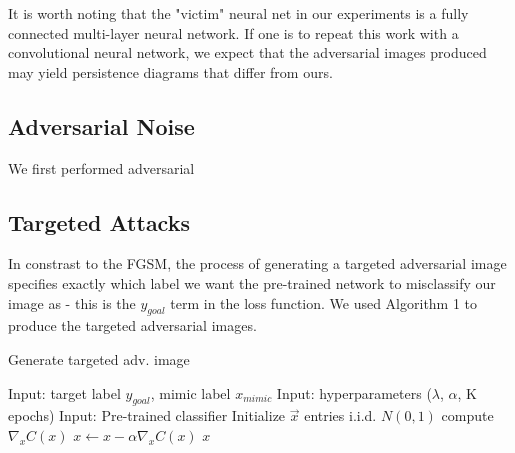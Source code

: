 \documentclass[twoside,twocolumn]{article}
\begin{document}
It is worth noting that the "victim" neural net in our experiments is a fully connected multi-layer neural network. If one is to repeat this work with a convolutional neural network, we expect that the adversarial images produced may yield persistence diagrams that differ from ours.

\subsection{Adversarial Noise}
We first performed adversarial 

\subsection{Targeted Attacks}

In constrast to the FGSM, the process of generating a targeted adversarial image specifies exactly which label we want the pre-trained network to misclassify our image as - this is the $y_{goal}$ term in the loss function. We used Algorithm 1 to produce the targeted adversarial images.

\begin{algorithm}
\caption{Generate targeted adv. image}
\begin{algorithmic}
\STATE Input: target label $y_{goal}$, mimic label $x_{mimic}$
\STATE Input: hyperparameters ($\lambda$, $\alpha$, K epochs)
\STATE Input: Pre-trained classifier
\STATE Initialize $\vec{x}$ entries i.i.d. $N(0,1)$
    \STATE compute $\nabla_x C(x)$
    \STATE $x \gets x - \alpha \nabla_x C(x)$
\ENDFOR
\RETURN $x$
\end{algorithmic}
\end{algorithm}

\end{document}
